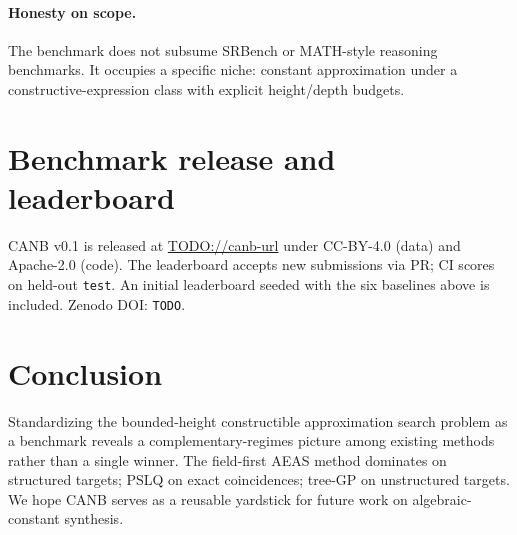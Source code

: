 \documentclass[11pt]{article}
\begin{document}
\paragraph{Honesty on scope.} The benchmark does not subsume SRBench or MATH-style reasoning benchmarks. It occupies a specific niche: constant approximation under a constructive-expression class with explicit height/depth budgets.

\section{Benchmark release and leaderboard}
\label{sec:release}

CANB v0.1 is released at \url{TODO://canb-url} under CC-BY-4.0 (data) and Apache-2.0 (code). The leaderboard accepts new submissions via PR; CI scores on held-out \texttt{test}. An initial leaderboard seeded with the six baselines above is included. Zenodo DOI: \texttt{TODO}.

\section{Conclusion}

Standardizing the bounded-height constructible approximation search problem as a benchmark reveals a complementary-regimes picture among existing methods rather than a single winner. The field-first AEAS method dominates on structured targets; PSLQ on exact coincidences; tree-GP on unstructured targets. We hope CANB serves as a reusable yardstick for future work on algebraic-constant synthesis.
\end{document}
